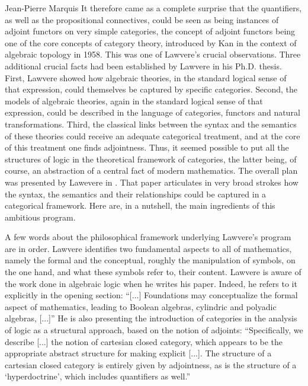 \begin{artengenv}{Jean-Pierre Marquis}
It therefore came as a complete surprise that the quantifiers, as well as the propositional connectives, could be seen as being instances of adjoint functors on very simple categories, the concept of adjoint functors being one of the core concepts of category theory, introduced by Kan in the context of algebraic topology in 1958. This was one of Lawvere's crucial observations. Three additional crucial facts had been established by Lawvere in his Ph.D. thesis. First,   Lawvere showed how  algebraic theories, in the standard logical sense of that expression, could themselves be captured by specific categories. Second, the models of algebraic theories, again in the standard logical sense of that expression, could be described in the language of categories, functors and natural transformations. Third, the classical links between the syntax and the semantics of these theories could receive an adequate categorical treatment, and at the core of this treatment one finds adjointness. Thus, it seemed possible to put all the structures of logic in the theoretical framework of categories, the latter being, of course, an abstraction of a central fact of modern mathematics. The overall plan was presented by Lawevere in \parencite*{Lawvere1969a}. That paper articulates in very broad strokes how the syntax, the semantics and their relationships could be captured in a categorical framework. Here are, in a nutshell, the main ingredients of this ambitious program.

A few words about the philosophical framework underlying Lawvere's program are in order. Lawvere identifies two fundamental aspects to all of mathematics, namely the formal and the conceptual, roughly the manipulation of symbols, on the one hand, and what these symbols refer to, their content. Lawvere is aware of the work done in algebraic logic when he writes his paper. Indeed, he refers to it explicitly in the opening section: ``[...] Foundations may conceptualize the formal aspect of mathematics, leading to Boolean algebras, cylindric and polyadic algebras, [...]''\parencite[][p.281]{Lawvere1969a} He is also presenting the introduction of categories in the analysis of logic as a structural approach, based on the notion of adjoints: ``Specifically, we describe [...] the notion of cartesian closed category, which appears to be the appropriate abstract structure for making explicit [...]. The structure of a cartesian closed category is entirely given by adjointness, as is the structure of a `hyperdoctrine', which includes quantifiers as well.''\parencite[][p.281]{Lawvere1969a} 


\end{artengenv}
